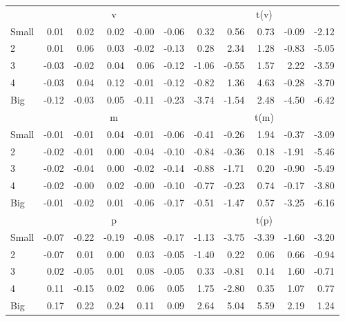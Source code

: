 \begin{table}[!ht]
\begin{tabular}{lrrrrrrrrrr}
  
     & \multicolumn{5}{c}{v} & \multicolumn{5}{c}{t(v)}   \\
     \cmidrule(r){2-6} \cmidrule(r){7-11} 
    Small  & 0.01  & 0.02  & 0.02  & -0.00  & -0.06  & 0.32  & 0.56  & 0.73  & -0.09  & -2.12   \\
    2  & 0.01  & 0.06  & 0.03  & -0.02  & -0.13  & 0.28  & 2.34  & 1.28  & -0.83  & -5.05   \\
    3  & -0.03  & -0.02  & 0.04  & 0.06  & -0.12  & -1.06  & -0.55  & 1.57  & 2.22  & -3.59   \\
    4  & -0.03  & 0.04  & 0.12  & -0.01  & -0.12  & -0.82  & 1.36  & 4.63  & -0.28  & -3.70   \\
    Big  & -0.12  & -0.03  & 0.05  & -0.11  & -0.23  & -3.74  & -1.54  & 2.48  & -4.50  & -6.42   \\
    
  
     & \multicolumn{5}{c}{m} & \multicolumn{5}{c}{t(m)}   \\
     \cmidrule(r){2-6} \cmidrule(r){7-11} 
    Small  & -0.01  & -0.01  & 0.04  & -0.01  & -0.06  & -0.41  & -0.26  & 1.94  & -0.37  & -3.09   \\
    2  & -0.02  & -0.01  & 0.00  & -0.04  & -0.10  & -0.84  & -0.36  & 0.18  & -1.91  & -5.46   \\
    3  & -0.02  & -0.04  & 0.00  & -0.02  & -0.14  & -0.88  & -1.71  & 0.20  & -0.90  & -5.49   \\
    4  & -0.02  & -0.00  & 0.02  & -0.00  & -0.10  & -0.77  & -0.23  & 0.74  & -0.17  & -3.80   \\
    Big  & -0.01  & -0.02  & 0.01  & -0.06  & -0.17  & -0.51  & -1.47  & 0.57  & -3.25  & -6.16   \\
    
  
     & \multicolumn{5}{c}{p} & \multicolumn{5}{c}{t(p)}   \\
     \cmidrule(r){2-6} \cmidrule(r){7-11} 
    Small  & -0.07  & -0.22  & -0.19  & -0.08  & -0.17  & -1.13  & -3.75  & -3.39  & -1.60  & -3.20   \\
    2  & -0.07  & 0.01  & 0.00  & 0.03  & -0.05  & -1.40  & 0.22  & 0.06  & 0.66  & -0.94   \\
    3  & 0.02  & -0.05  & 0.01  & 0.08  & -0.05  & 0.33  & -0.81  & 0.14  & 1.60  & -0.71   \\
    4  & 0.11  & -0.15  & 0.02  & 0.06  & 0.05  & 1.75  & -2.80  & 0.35  & 1.07  & 0.77   \\
    Big  & 0.17  & 0.22  & 0.24  & 0.11  & 0.09  & 2.64  & 5.04  & 5.59  & 2.19  & 1.24   \\
    
  
  \bottomrule
\end{tabular}
\label{tbl:25_Size_Acc_B16}
\end{table}